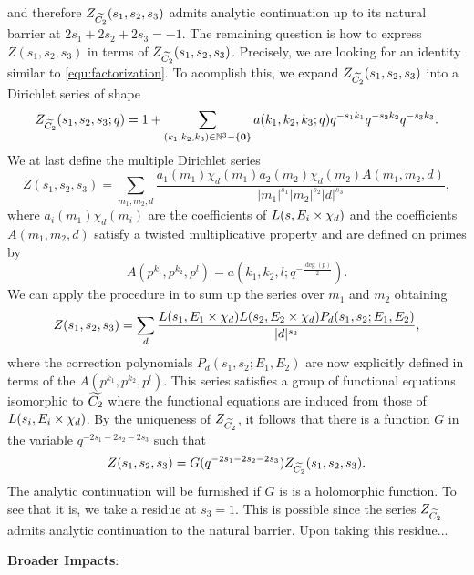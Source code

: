\documentclass[12pt,reqno,oneside]{amsart}
\begin{document}
and therefore $Z_{\widetilde{C_{2}}}(s_{1},s_{2},s_{3})$ admits analytic continuation up to its natural barrier at $2s_{1}+2s_{2}+2s_{3} = -1$. The remaining question is how to express $Z(s_{1},s_{2},s_{3})$ in terms of $Z_{\widetilde{C_{2}}}(s_{1},s_{2},s_{3})$. Precisely, we are looking for an identity similar to \cref{equ:factorization}. To acomplish this, we expand $Z_{\widetilde{C_{2}}}(s_{1},s_{2},s_{3})$ into a Dirichlet series of shape
\[
  Z_{\widetilde{C_{2}}}(s_{1},s_{2},s_{3};q) = 1+\sum_{(k_{1},k_{2},k_{3}) \in \mathbb{N}^{3}-\{\mathbf{0}\}}a(k_{1},k_{2},k_{3};q)q^{-s_{1}k_{1}}q^{-s_{2}k_{2}}q^{-s_{3}k_{3}}.
\]
We at last define the multiple Dirichlet series
\[
  Z(s_{1},s_{2},s_{3}) = \sum_{m_{1},m_{2},d}\frac{a_{1}(m_{1})\chi_{d}(m_{1})a_{2}(m_{2})\chi_{d}(m_{2})A(m_{1},m_{2},d)}{|m_{1}|^{s_{1}}|m_{2}|^{s_{2}}|d|^{s_{3}}},
\]
where $a_{i}(m_{1})\chi_{d}(m_{i})$ are the coefficients of $L(s,E_{i} \times \chi_{d})$ and the coefficients $A(m_{1},m_{2},d)$ satisfy a twisted multiplicative property and are defined on primes by
\[
  A(p^{k_{1}},p^{k_{2}},p^{l}) = a\left(k_{1},k_{2},l;q^{-\frac{\deg(p)}{2}}\right). 
\]
We can apply the procedure in \cite{D} to sum up the series over $m_{1}$ and $m_{2}$ obtaining
\[
  Z(s_{1},s_{2},s_{3}) =  \sum_{d}\frac{L(s_{1},E_{1} \times \chi_{d})L(s_{2},E_{2} \times \chi_{d})P_{d}(s_{1},s_{2};E_{1},E_{2})}{|d|^{s_{3}}},
\]
where the correction polynomials $P_{d}(s_{1},s_{2};E_{1},E_{2})$ are now explicitly defined in terms of the $A(p^{k_{1}},p^{k_{2}},p^{l})$. This series satisfies a group of functional equations isomorphic to $\widetilde{C_{2}}$ where the functional equations are induced from those of $L(s_{i},E_{i} \times \chi_{d})$. By the uniqueness of $Z_{\widetilde{C_{2}}}$, it follows that there is a function $G$ in the variable $q^{-2s_{1}-2s_{2}-2s_{3}}$ such that
\[
  Z(s_{1},s_{2},s_{3}) = G(q^{-2s_{1}-2s_{2}-2s_{3}})Z_{\widetilde{C_{2}}}(s_{1},s_{2},s_{3}).
\]
The analytic continuation will be furnished if $G$ is is a holomorphic function. To see that it is, we take a residue at $s_{3} = 1$. This is possible since the series $Z_{\widetilde{C_{2}}}$ admits analytic continuation to the natural barrier. Upon taking this residue...

\textbf{Broader Impacts}:
\end{document}
